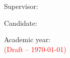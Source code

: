 \begin{titlepage}
    \begin{minipage}[t]{0.45\textwidth}
        \begin{flushleft}\large
            Supervisor: \\
            \textbf{\Supervisor}
        \end{flushleft}
    \end{minipage}
    \hfill
    \begin{minipage}[t]{0.45\textwidth}
        \begin{flushright}\large
            Candidate: \\
            \textbf{\ThesisAuthor}
            \ifdef{\ThesisStudentID}{%
                \\
                \textbf{\ThesisStudentID}
            }{}
        \end{flushright}
    \end{minipage}

    \vfill

    \begin{center}
        {\large Academic year: \YearSubmitted}
        \ifWIP
            \\[1ex]\small\ttfamily \textcolor{red}{(Draft -- \today)}
        \fi
    \end{center}
\end{titlepage}
